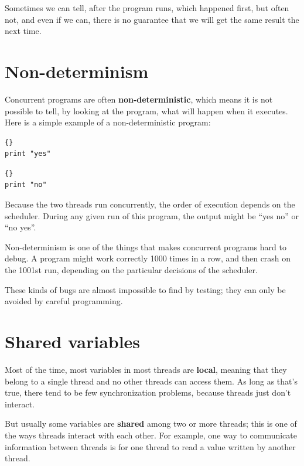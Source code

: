 \documentclass{book}
\begin{document}
Sometimes we can tell, after the program runs, which happened first,
but often not, and even if we can, there is no guarantee that we will
get the same result the next time.


\newpage
\section {Non-determinism}

Concurrent programs are often {\bf non-deterministic}, which means it
is not possible to tell, by looking at the program, what will happen
when it executes.  Here is a simple example of a
non-deterministic program:

\begin{minipage}[t]{2in}
\begin{lstlisting}[title={Thread A}]{}
print "yes"
\end{lstlisting}
\end{minipage}
\hfill
\begin{minipage}[t]{2in}
\begin{lstlisting}[title={Thread B}]{}
print "no"
\end{lstlisting}
\end{minipage}

Because the two threads run concurrently, the order of
execution depends on the scheduler.  During any given run
of this program, the output might be ``yes no'' or ``no yes''.

Non-determinism is one of the things that makes concurrent
programs hard to debug.  A program might work correctly
1000 times in a row, and then crash on the 1001st run, depending
on the particular decisions of the scheduler.

These kinds of bugs are almost impossible to find by testing;
they can only be avoided by careful programming.


\section {Shared variables}
\label{shared}

Most of the time, most variables in most threads are {\bf local},
meaning that they belong to a single thread and no other threads
can access them.  As long as that's true, there tend to be few
synchronization problems, because threads just don't interact.

But usually some variables are {\bf shared} among two or more
threads; this is one of the ways threads interact with each other.
For example, one way to communicate information between threads is
for one thread to read a value written by another thread.
\end{document}
